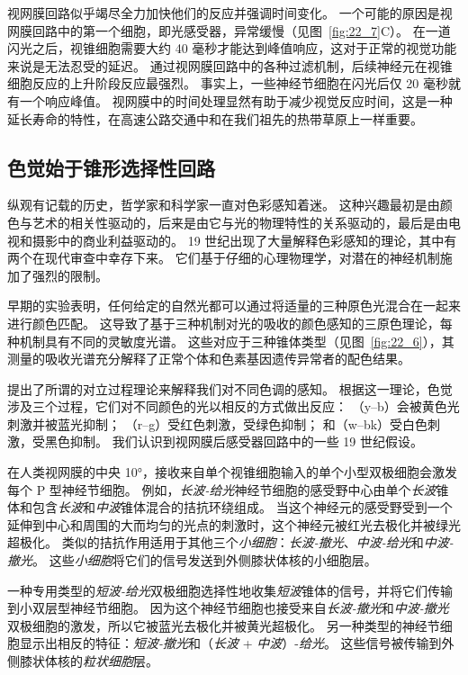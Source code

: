 视网膜回路似乎竭尽全力加快他们的反应并强调时间变化。
一个可能的原因是视网膜回路中的第一个细胞，即光感受器，异常缓慢（见图~\ref{fig:22_7}C）。
在一道闪光之后，视锥细胞需要大约 40 毫秒才能达到峰值响应，这对于正常的视觉功能来说是无法忍受的延迟。
通过视网膜回路中的各种过滤机制，后续神经元在视锥细胞反应的上升阶段反应最强烈。
事实上，一些神经节细胞在闪光后仅 20 毫秒就有一个响应峰值。
视网膜中的时间处理显然有助于减少视觉反应时间，这是一种延长寿命的特性，在高速公路交通中和在我们祖先的热带草原上一样重要。



\subsection{色觉始于锥形选择性回路}

纵观有记载的历史，哲学家和科学家一直对色彩感知着迷。
这种兴趣最初是由颜色与艺术的相关性驱动的，后来是由它与光的物理特性的关系驱动的，最后是由电视和摄影中的商业利益驱动的。
19 世纪出现了大量解释色彩感知的理论，其中有两个在现代审查中幸存下来。
它们基于仔细的心理物理学，对潜在的神经机制施加了强烈的限制。


早期的实验表明，任何给定的自然光都可以通过将适量的三种原色光混合在一起来进行颜色匹配。
这导致了基于三种机制对光的吸收的颜色感知的三原色理论，每种机制具有不同的灵敏度光谱。
这些对应于三种锥体类型（见图~\ref{fig:22_6}），其测量的吸收光谱充分解释了正常个体和色素基因遗传异常者的配色结果。


提出了所谓的对立过程理论来解释我们对不同色调的感知。
根据这一理论，色觉涉及三个过程，它们对不同颜色的光以相反的方式做出反应：
（y–b）会被黄色光刺激并被蓝光抑制； 
（r–g）受红色刺激，受绿色抑制；
和（w–bk）受白色刺激，受黑色抑制。
我们认识到视网膜后感受器回路中的一些 19 世纪假设。


在人类视网膜的中央 10°，接收来自单个视锥细胞输入的单个小型双极细胞会激发每个 P 型神经节细胞。
例如，\textit{长波-给光}神经节细胞的感受野中心由单个\textit{长波}锥体和包含\textit{长波}和\textit{中波}锥体混合的拮抗环绕组成。
当这个神经元的感受野受到一个延伸到中心和周围的大而均匀的光点的刺激时，这个神经元被红光去极化并被绿光超极化。
类似的拮抗作用适用于其他三个\textit{小细胞}：\textit{长波-撤光}、\textit{中波-给光}和\textit{中波-撤光}。
这些\textit{小细胞}将它们的信号发送到外侧膝状体核的小细胞层。


一种专用类型的\textit{短波-给光}双极细胞选择性地收集\textit{短波}锥体的信号，并将它们传输到小双层型神经节细胞。
因为这个神经节细胞也接受来自\textit{长波-撤光}和\textit{中波-撤光}双极细胞的激发，所以它被蓝光去极化并被黄光超极化。
另一种类型的神经节细胞显示出相反的特征：\textit{短波-撤光}和（\textit{长波} + \textit{中波}）-\textit{给光}。
这些信号被传输到外侧膝状体核的\textit{粒状细胞}层。



